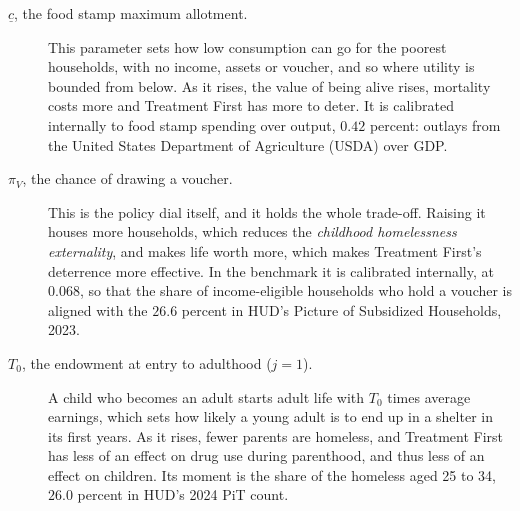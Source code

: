 \documentclass[10pt]{article}
\begin{document}
\begin{description}
\item[$\underline c$, the food stamp maximum allotment.] This parameter sets how low consumption can go for the poorest households, with no income, assets or voucher, and so where utility is bounded from below. As it rises, the value of being alive rises, mortality costs more and Treatment First has more to deter. It is calibrated internally to food stamp spending over output, $0.42$ percent: outlays from the United States Department of Agriculture (USDA) over GDP.
\item[$\pi_V$, the chance of drawing a voucher.] This is the policy dial itself, and it holds the whole trade-off. Raising it houses more households, which reduces the \emph{childhood homelessness externality}, and makes life worth more, which makes Treatment First's deterrence more effective. In the benchmark it is calibrated internally, at $0.068$, so that the share of income-eligible households who hold a voucher is aligned with the $26.6$ percent in HUD's Picture of Subsidized Households, 2023.
\item[$T_0$, the endowment at entry to adulthood ($j=1$).] A child who becomes an adult starts adult life with $T_0$ times average earnings, which sets how likely a young adult is to end up in a shelter in its first years.   As it rises, fewer parents are homeless, and Treatment First has less of an effect on drug use during parenthood, and thus less of an effect on children. Its moment is the share of the homeless aged 25 to 34, $26.0$ percent in HUD's 2024 PiT count.
\end{description}
\end{document}
